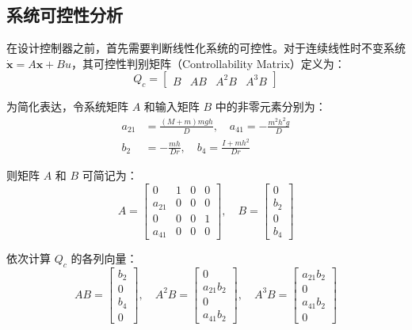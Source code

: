 \subsection{系统可控性分析}

在设计控制器之前，首先需要判断线性化系统的可控性。对于连续线性时不变系统 $\dot{\mathbf{x}} = A\mathbf{x} + Bu$，其可控性判别矩阵（Controllability Matrix）定义为：
\begin{equation}
Q_c = \begin{bmatrix} B & AB & A^2B & A^3B \end{bmatrix}
\end{equation}

为简化表达，令系统矩阵 $A$ 和输入矩阵 $B$ 中的非零元素分别为：
\begin{equation}
\begin{aligned}
a_{21} &= \frac{(M+m)mgh}{D}, \quad a_{41} = -\frac{m^2h^2g}{D} \\
b_2 &= -\frac{mh}{Dr}, \quad b_4 = \frac{I+mh^2}{Dr}
\end{aligned}
\end{equation}

则矩阵 $A$ 和 $B$ 可简记为：
\begin{equation}
A = \begin{bmatrix} 0 & 1 & 0 & 0 \\ a_{21} & 0 & 0 & 0 \\ 0 & 0 & 0 & 1 \\ a_{41} & 0 & 0 & 0 \end{bmatrix}, \quad B = \begin{bmatrix} 0 \\ b_2 \\ 0 \\ b_4 \end{bmatrix}
\end{equation}

依次计算 $Q_c$ 的各列向量：
\begin{equation}
AB = \begin{bmatrix} b_2 \\ 0 \\ b_4 \\ 0 \end{bmatrix}, \quad A^2B = \begin{bmatrix} 0 \\ a_{21}b_2 \\ 0 \\ a_{41}b_2 \end{bmatrix}, \quad A^3B = \begin{bmatrix} a_{21}b_2 \\ 0 \\ a_{41}b_2 \\ 0 \end{bmatrix}
\end{equation}

